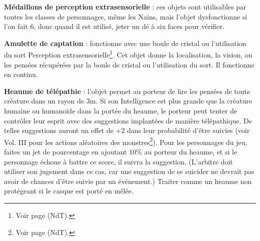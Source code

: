 {\bigskip

\label{objet-medaillon-esp}\textbf{Médaillons de perception extrasensorielle} : ces objets sont utilisables par toutes les classes de personnages, même les Nains, mais l'objet dysfonctionne si l'on fait 6, donc quand il est utilisé, jeter un dé à six faces pour vérifier.

\bigskip

\label{objet-amulette-captation}\textbf{Amulette de captation} : fonctionne avec une boule de cristal ou l'utilisation du sort Perception extrasensorielle\footnote{Voir page \pageref{sort-esp} (NdT).}. Cet objet donne la localisation, la vision, ou les pensées récupérées par la boule de cristal ou l'utilisation du sort. Il fonctionne en continu.

\bigskip

\label{objet-heaume-telepathie}\textbf{Heaume de télépathie} : l'objet permet au porteur de lire les pensées de toute créature dans un rayon de 3m. Si son Intelligence est plus grande que la créature humaine ou humanoïde dans la portée du heaume, le porteur peut tenter de contrôler leur esprit avec des suggestions implantées de manière télépathique. De telles suggestions auront un effet de +2 dans leur probabilité d'être suivies (voir Vol. III pour les actions aléatoires des monstres\footnote{Voir page \pageref{dd3-actions-monstres} (NdT).}). Pour les personnages du jeu, faites un jet de pourcentage en ajoutant 10\% au porteur du heaume, et si le personnage échoue à battre ce score, il suivra la suggestion. (L'arbitre doit utiliser son jugement dans ce cas, car une suggestion de se suicider ne devrait pas avoir de chances d'être suivie par un événement.) Traiter comme un heaume non protégeant si le casque est porté en mêlée.

}%


